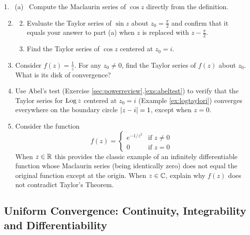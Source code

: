 \begin{exercises}
	\hangindent\doubleind
	\textup{1.} \ (a) \ Compute the Maclaurin series of $\cos z$ directly from the definition.
	\begin{enumerate}\setcounter{enumi}{1}
	  \item[]\begin{enumerate}\setcounter{enumii}{1}\vspace{-3pt}
	    \item Evaluate the Taylor series of $\sin z$ about $z_0=\frac\pi 2$ and confirm that it equals your answer to part (a) when $z$ is replaced with $z-\frac\pi 2$.
	    
	    \item Find the Taylor series of $\cos z$ centered at $z_0=i$.
	  \end{enumerate} 
	  
	  
	  \item Consider $f(z)=\frac 1z$. For any $z_0\neq 0$, find the Taylor series of $f(z)$ about $z_0$. What is its disk of convergence?
	  	  
	  
	  \item\label{exs:abel2} Use Abel's test (Exercise \ref*{sec:powerreview}.\ref{exs:abeltest}) to verify that the Taylor series for $\operatorname{Log} z$ centered at $z_0=i$ (Example \ref{ex:logtaylori}) converges everywhere on the boundary circle $\left| z-i\right|=1$, except when $z=0$.

	    
	  \item\label{ex:maczero} Consider the function
	  \[
	  	f(z)=
	  	\begin{cases}
	  		e^{-1/z^2}&\text{if }z\neq 0\\
	  		0&\text{if }z=0
	  	\end{cases}
	  \]
	  When $z\in\mathbb{R}$ this provides the classic example of an infinitely differentiable function whose Maclaurin series (being identically zero) does not equal the original function except at the origin. When $z\in\mathbb{C}$, explain why $f(z)$ does not contradict Taylor's Theorem.
	  
	\end{enumerate}
\end{exercises}
\clearpage



\subsection{Uniform Convergence: Continuity, Integrability and Differentiability}\label{sec:unifconv}

